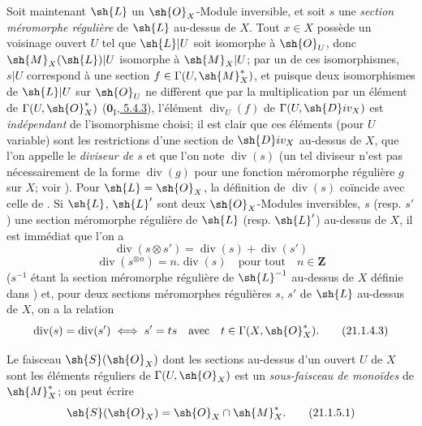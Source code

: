 \begin{env}[21.1.4]
Soit maintenant $\sh{L}$ un $\sh{O}_X$-Module inversible, et soit $s$ une \emph{section méromorphe régulière}  de $\sh{L}$ au-dessus de $X$.
Tout $x\in X$ possède un voisinage ouvert $U$ tel que $\sh{L}|U$ soit isomorphe à $\sh{O}_U$, donc $\sh{M}_X(\sh{L})|U$ isomorphe à $\sh{M}_X|U$;
par un de ces isomorphismes, $s|U$ correspond à une section $f\in\Gamma(U,\sh{M}_X^*)$, et puisque deux isomorphismes de $\sh{L}|U$ sur $\sh{O}_U$ ne diffèrent que par la multiplication par un élément de $\Gamma(U,\sh{O}_X^*)$ (\hyperref[0.5.4.3]{$\mathbf{0}_{\mathrm I}$, 5.4.3}), l'élément $\operatorname{div}_U(f)$ de $\Gamma(U,\sh{D}iv_X)$ est \emph{indépendant} de l'isomorphisme choisi;
il est clair que ces éléments (pour $U$ variable) sont les restrictions d'une section de $\sh{D}iv_X$ au-dessus de $X$, que l'on appelle le \emph{diviseur de $s$} et que l'on note $\operatorname{div}(s)$ (un tel diviseur n'est pas nécessairement de la forme $\operatorname{div}(g)$ pour une fonction méromorphe régulière $g$ sur $X$; voir ).
Pour $\sh{L}=\sh{O}_X$, la définition de $\operatorname{div}(s)$ coïncide avec celle de .
Si $\sh{L}$, $\sh{L}'$ sont deux $\sh{O}_X$-Modules inversibles, $s$ (resp. $s'$) une section méromorphe régulière de $\sh{L}$ (resp. $\sh{L}'$) au-dessus de $X$, il est immédiat que l'on a
\[
\label{IV.21.1.4.1}
  \operatorname{div}(s\otimes s')=\operatorname{div}(s)+\operatorname{div}(s')
  \tag{21.1.4.1}
\]
\[
\label{IV.21.1.4.2}
  \operatorname{div}(s^{\otimes n})=n.\operatorname{div}(s) \quad\text{pour tout}\quad n\in\mathbf{Z}
  \tag{21.1.4.2}
\]
($s^{-1}$ étant la section méromorphe régulière de $\sh{L}^{-1}$ au-dessus de $X$ définie dans )
et, pour deux sections méromorphes régulières $s$, $s'$ de $\sh{L}$ au-dessus de $X$, on a la relation
\[
\label{IV.21.1.4.3}
  \operatorname{div}(s)=\operatorname{div}(s') \iff s'=ts \quad\text{avec}\quad t\in\Gamma(X,\sh{O}_X^*).
  \tag{21.1.4.3}
\]
\end{env}

\begin{env}[21.1.5]
\label{IV.21.1.5}
Le faisceau $\sh{S}(\sh{O}_X)$  dont les sections au-dessus d'un ouvert $U$ de $X$ sont les éléments réguliers de $\Gamma(U,\sh{O}_X)$ est un \emph{sous-faisceau de monoïdes} de $\sh{M}_X^*$; on peut écrire
\[
\label{IV.21.1.5.1}
  \sh{S}(\sh{O}_X)=\sh{O}_X\cap\sh{M}_X^*.
  \tag{21.1.5.1}
\]
\end{env}

